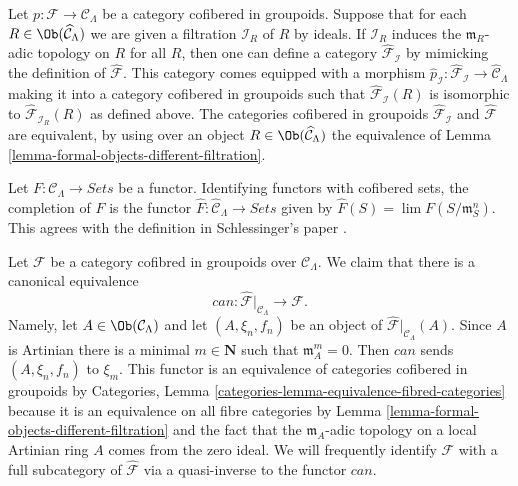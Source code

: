 \begin{remark}
\label{remark-different-sequence-ideals}
Let $p: \mathcal{F} \to \mathcal{C}_\Lambda$ be a category cofibered in
groupoids. Suppose that for each
$R \in \Ob(\widehat{\mathcal{C}}_\Lambda)$ we are given a filtration
$\mathcal{I}_R$ of $R$ by ideals. If
$\mathcal{I}_R$ induces the $\mathfrak m_R$-adic topology on $R$ for all $R$,
then one can define a category
$\widehat{\mathcal{F}}_\mathcal{I}$ by mimicking
the definition of $\widehat{\mathcal{F}}$. This category comes equipped with a
morphism
$\widehat{p}_\mathcal{I} : \widehat{\mathcal{F}}_\mathcal{I} \to
\widehat{\mathcal{C}}_\Lambda$ making it into a category cofibered in
groupoids such that $\widehat{\mathcal{F}}_\mathcal{I}(R)$ is isomorphic to
$\widehat{\mathcal{F}}_{\mathcal{I}_R}(R)$ as defined above. The categories
cofibered in groupoids $\widehat{\mathcal{F}}_\mathcal{I}$ and
$\widehat{\mathcal{F}}$ are equivalent, by using over an object
$R \in \Ob(\widehat{\mathcal{C}}_\Lambda)$
the equivalence of
Lemma \ref{lemma-formal-objects-different-filtration}.
\end{remark}

\begin{remark}
\label{remark-completion-functor}
Let $F: \mathcal{C}_\Lambda \to \textit{Sets}$ be a functor.
Identifying functors with cofibered sets, the completion of $F$ is the functor
$\widehat{F} : \widehat{\mathcal{C}}_\Lambda \to \textit{Sets}$
given by $\widehat{F}(S) = \lim F(S/\mathfrak{m}_S^{n})$.  This agrees
with the definition in Schlessinger's paper \cite{Sch}.
\end{remark}

\begin{remark}
\label{remark-restrict-completion}
Let $\mathcal{F}$ be a category cofibred in groupoids over
$\mathcal{C}_\Lambda$. We claim that there is a canonical
equivalence
$$
can :
\widehat{\mathcal{F}}|_{\mathcal{C}_\Lambda}
\longrightarrow
\mathcal{F}.
$$
Namely, let $A \in \Ob(\mathcal{C}_\Lambda)$ and let
$(A, \xi_n, f_n)$ be an object of
$\widehat{\mathcal{F}}|_{\mathcal{C}_\Lambda}(A)$.
Since $A$ is Artinian there is a minimal $m \in \mathbf{N}$
such that $\mathfrak m_A^m = 0$. Then $can$ sends $(A, \xi_n, f_n)$ to $\xi_m$.
This functor is an equivalence of categories cofibered in groupoids by
Categories, Lemma \ref{categories-lemma-equivalence-fibred-categories}
because it is an equivalence on all fibre categories by
Lemma \ref{lemma-formal-objects-different-filtration}
and the fact that the $\mathfrak m_A$-adic topology on a local
Artinian ring $A$ comes from the zero ideal. We will frequently identify
$\mathcal{F}$ with a full subcategory of $\widehat{\mathcal{F}}$ via a
quasi-inverse to the functor $can$.
\end{remark}


